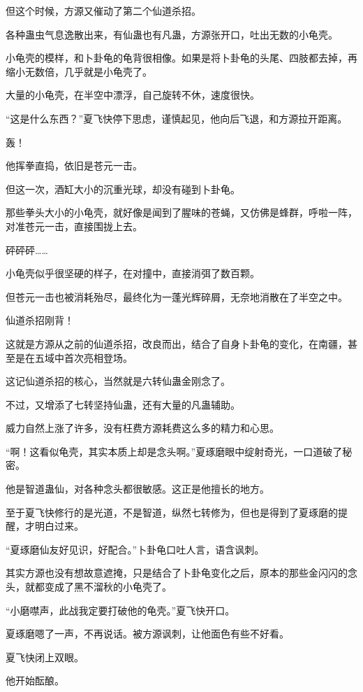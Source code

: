 \begin{this_body}
但这个时候，方源又催动了第二个仙道杀招。

各种蛊虫气息逸散出来，有仙蛊也有凡蛊，方源张开口，吐出无数的小龟壳。

小龟壳的模样，和卜卦龟的龟背很相像。如果是将卜卦龟的头尾、四肢都去掉，再缩小无数倍，几乎就是小龟壳了。

大量的小龟壳，在半空中漂浮，自己旋转不休，速度很快。

“这是什么东西？”夏飞快停下思虑，谨慎起见，他向后飞退，和方源拉开距离。

轰！

他挥拳直捣，依旧是苍元一击。

但这一次，酒缸大小的沉重光球，却没有碰到卜卦龟。

那些拳头大小的小龟壳，就好像是闻到了腥味的苍蝇，又仿佛是蜂群，呼啦一阵，对准苍元一击，直接围拢上去。

砰砰砰……

小龟壳似乎很坚硬的样子，在对撞中，直接消弭了数百颗。

但苍元一击也被消耗殆尽，最终化为一蓬光辉碎屑，无奈地消散在了半空之中。

仙道杀招刚背！

这就是方源从之前的仙道杀招，改良而出，结合了自身卜卦龟的变化，在南疆，甚至是在五域中首次亮相登场。

这记仙道杀招的核心，当然就是六转仙蛊金刚念了。

不过，又增添了七转坚持仙蛊，还有大量的凡蛊辅助。

威力自然上涨了许多，没有枉费方源耗费这么多的精力和心思。

“啊！这看似龟壳，其实本质上却是念头啊。”夏琢磨眼中绽射奇光，一口道破了秘密。

他是智道蛊仙，对各种念头都很敏感。这正是他擅长的地方。

至于夏飞快修行的是光道，不是智道，纵然七转修为，但也是得到了夏琢磨的提醒，才明白过来。

“夏琢磨仙友好见识，好配合。”卜卦龟口吐人言，语含讽刺。

其实方源也没有想故意遮掩，只是结合了卜卦龟变化之后，原本的那些金闪闪的念头，就都变成了黑不溜秋的小龟壳了。

“小磨噤声，此战我定要打破他的龟壳。”夏飞快开口。

夏琢磨嗯了一声，不再说话。被方源讽刺，让他面色有些不好看。

夏飞快闭上双眼。

他开始酝酿。


\end{this_body}
